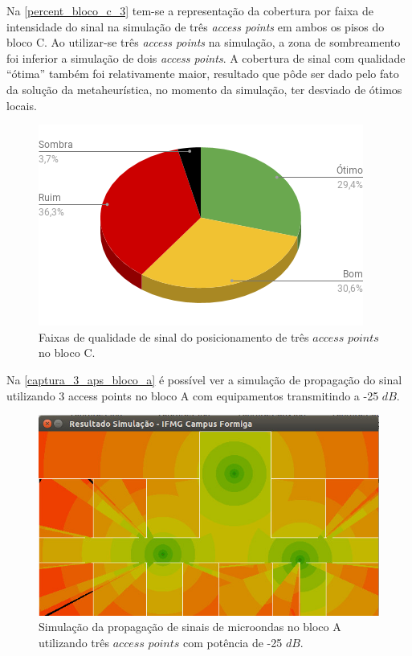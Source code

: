 \documentclass[
	12pt,				%
	twoside,			%
	a4paper,			%
	english,			%
	french,				%
	spanish,			%
	brazil				%
	]{abntex2}
\begin{document}
Na \autoref{percent_bloco_c_3} tem-se a representação da cobertura por
faixa de intensidade do sinal na simulação de três \emph{access points}
em ambos os pisos do bloco C. Ao utilizar-se três \emph{access points}
na simulação, a zona de sombreamento foi inferior a simulação de dois
\emph{access points}. A cobertura de sinal com qualidade ``ótima''
também foi relativamente maior, resultado que pôde ser dado pelo fato da
solução da metaheurística, no momento da simulação, ter desviado de
ótimos locais.

\begin{figure}[!ht]
    \caption{\label{percent_bloco_c_3} Faixas de qualidade de sinal do posicionamento de três $access$ $points$ no bloco C.}
    \begin{center}
        \includegraphics[scale=0.6]{imagens/percent-bloco-c-3.png}
    \end{center}
\end{figure}

Na \autoref{captura_3_aps_bloco_a} é possível ver a simulação de
propagação do sinal utilizando 3 access points no bloco A com
equipamentos transmitindo a -25 \(dB\).

\begin{figure}[ht]
    \caption{\label{captura_3_aps_bloco_a} Simulação da propagação de sinais de microondas no bloco A utilizando três $access$ $points$ com potência de -25 $dB$.}
    \begin{center}
        \includegraphics[scale=0.5]{imagens/captura-3-aps-bloco-a.jpg}
    \end{center}
\end{figure}
\end{document}

